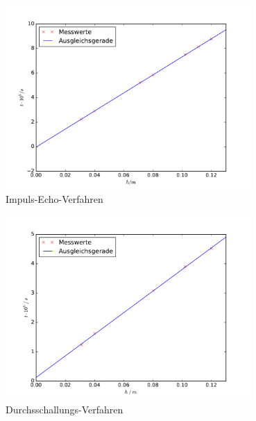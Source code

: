 \begin{figure}
  \centering
  \includegraphics[height= 7cm]{plots/IE_plot.pdf}
  \caption{Impuls-Echo-Verfahren}
  \label{fig:IEplot}
\end{figure}
\begin{figure}
  \centering
  \includegraphics[height = 7cm]{plots/DS_plot.pdf}
  \caption{Durchsschallungs-Verfahren}
  \label{fig:DSplot}
\end{figure}
\FloatBarrier
